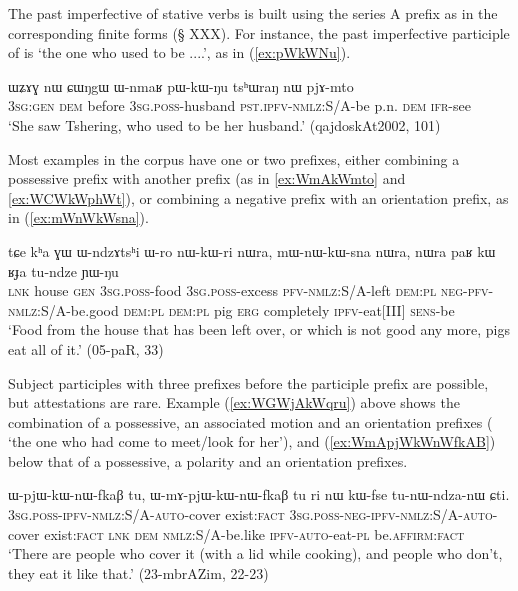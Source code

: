 The past imperfective of stative verbs is built using the series A prefix  as in the corresponding finite forms (§ XXX). For instance, the past imperfective participle of  is  `the one who used to be ....', as in (\ref{ex:pWkWNu}).

\begin{exe}
\ex \label{ex:pWkWNu}
 \gll  ɯʑɤɣ nɯ ɕɯŋgɯ ɯ-nmaʁ pɯ-kɯ-ŋu tsʰɯraŋ nɯ pjɤ-mto \\
 \textsc{3sg}:\textsc{gen} \textsc{dem} before \textsc{3sg}.\textsc{poss}-husband \textsc{pst}.\textsc{ipfv}-\textsc{nmlz}:S/A-be p.n. \textsc{dem} \textsc{ifr}-see \\
\glt `She saw Tshering, who used to be her husband.' (qajdoskAt2002, 101)
\end{exe}

Most examples in the corpus have one or two prefixes, either combining a possessive prefix with another prefix (as in \ref{ex:WmAkWmto} and \ref{ex:WCWkWphWt}), or combining a negative prefix with an orientation prefix, as in (\ref{ex:mWnWkWsna}).

 \begin{exe}
\ex \label{ex:mWnWkWsna}
 \gll tɕe kʰa ɣɯ ɯ-ndzɤtsʰi ɯ-ro nɯ-kɯ-ri nɯra, mɯ-nɯ-kɯ-sna nɯra, nɯra paʁ kɯ ʁɟa tu-ndze ɲɯ-ŋu \\
 \textsc{lnk} house \textsc{gen} \textsc{3sg}.\textsc{poss}-food \textsc{3sg}.\textsc{poss}-excess \textsc{pfv}-\textsc{nmlz}:S/A-left \textsc{dem}:\textsc{pl}  \textsc{neg}-\textsc{pfv}-\textsc{nmlz}:S/A-be.good \textsc{dem}:\textsc{pl} \textsc{dem}:\textsc{pl} pig \textsc{erg} completely  \textsc{ipfv}-eat[III] \textsc{sens}-be \\
 \glt  `Food from the house that has been left over, or which is not good any more, pigs eat all of it.' (05-paR, 33)
\end{exe}

Subject participles with three prefixes before the participle prefix  are possible, but attestations are rare. Example (\ref{ex:WGWjAkWqru}) above shows the combination of a possessive, an associated motion and an orientation prefixes ( `the one who had come to meet/look for her'), and (\ref{ex:WmApjWkWnWfkAB}) below that of a possessive, a polarity and an orientation prefixes.

\begin{exe}
\ex \label{ex:WmApjWkWnWfkAB}
 \gll ɯ-pjɯ-kɯ-nɯ-fkaβ tu, ɯ-mɤ-pjɯ-kɯ-nɯ-fkaβ tu ri nɯ kɯ-fse tu-nɯ-ndza-nɯ ɕti. \\
 \textsc{3sg}.\textsc{poss}-\textsc{ipfv}-\textsc{nmlz}:S/A-\textsc{auto}-cover exist:\textsc{fact}  \textsc{3sg}.\textsc{poss}-\textsc{neg}-\textsc{ipfv}-\textsc{nmlz}:S/A-\textsc{auto}-cover exist:\textsc{fact} \textsc{lnk} \textsc{dem} \textsc{nmlz}:S/A-be.like \textsc{ipfv}-\textsc{auto}-eat-\textsc{pl} be.\textsc{affirm}:\textsc{fact} \\
 \glt `There are people who cover it (with a lid while cooking), and people who don't, they eat it like that.' (23-mbrAZim, 22-23)
\end{exe}

